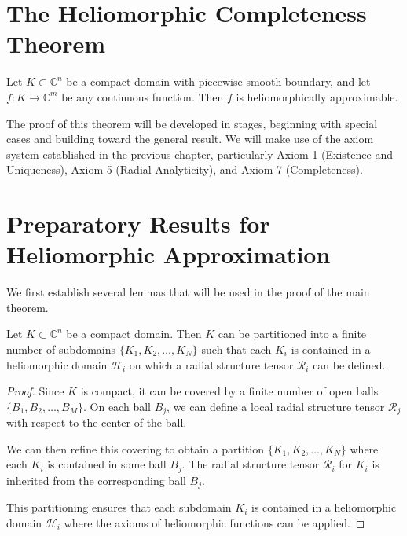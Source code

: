 \section{The Heliomorphic Completeness Theorem}

\begin{theorem}
Let $K \subset \mathbb{C}^n$ be a compact domain with piecewise smooth boundary, and let $f: K \rightarrow \mathbb{C}^m$ be any continuous function. Then $f$ is heliomorphically approximable.
\end{theorem}

The proof of this theorem will be developed in stages, beginning with special cases and building toward the general result. We will make use of the axiom system established in the previous chapter, particularly Axiom 1 (Existence and Uniqueness), Axiom 5 (Radial Analyticity), and Axiom 7 (Completeness).

\section{Preparatory Results for Heliomorphic Approximation}

We first establish several lemmas that will be used in the proof of the main theorem.

\begin{lemma}
Let $K \subset \mathbb{C}^n$ be a compact domain. Then $K$ can be partitioned into a finite number of subdomains $\{K_1, K_2, \ldots, K_N\}$ such that each $K_i$ is contained in a heliomorphic domain $\mathcal{H}_i$ on which a radial structure tensor $\mathcal{R}_i$ can be defined.
\end{lemma}

\begin{proof}
Since $K$ is compact, it can be covered by a finite number of open balls $\{B_1, B_2, \ldots, B_M\}$. On each ball $B_j$, we can define a local radial structure tensor $\mathcal{R}_j$ with respect to the center of the ball.

We can then refine this covering to obtain a partition $\{K_1, K_2, \ldots, K_N\}$ where each $K_i$ is contained in some ball $B_j$. The radial structure tensor $\mathcal{R}_i$ for $K_i$ is inherited from the corresponding ball $B_j$.

This partitioning ensures that each subdomain $K_i$ is contained in a heliomorphic domain $\mathcal{H}_i$ where the axioms of heliomorphic functions can be applied.
\end{proof}

